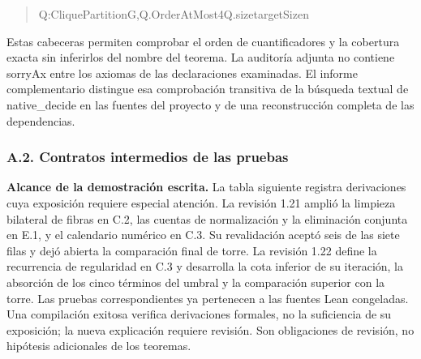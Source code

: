 \documentclass[spanish,11pt,a4paper]{article}
\newlength{\LeanCharWidth}
\begin{document}
\begin{quote}
\noindent \hspace*{\dimexpr 8\LeanCharWidth\relax}{\LeanSymbols ∃}\hspace*{\dimexpr 1\LeanCharWidth\relax}Q\hspace*{\dimexpr 1\LeanCharWidth\relax}:\hspace*{\dimexpr 1\LeanCharWidth\relax}CliquePartition\hspace*{\dimexpr 1\LeanCharWidth\relax}G,\hspace*{\dimexpr 1\LeanCharWidth\relax}Q.OrderAtMost\hspace*{\dimexpr 1\LeanCharWidth\relax}4\hspace*{\dimexpr 1\LeanCharWidth\relax}{\LeanSymbols ∧}\hspace*{\dimexpr 1\LeanCharWidth\relax}Q.size\hspace*{\dimexpr 1\LeanCharWidth\relax}{\LeanSymbols ≤}\hspace*{\dimexpr 1\LeanCharWidth\relax}targetSize\hspace*{\dimexpr 1\LeanCharWidth\relax}n\par
\end{quote}

Estas cabeceras permiten comprobar el orden de cuantificadores y la cobertura exacta sin inferirlos del nombre del teorema. La auditoría adjunta no contiene {\ttfamily\small sorryAx} entre los axiomas de las declaraciones examinadas. El informe complementario distingue esa comprobación transitiva de la búsqueda textual de {\ttfamily\small native\_\discretionary{\hbox{\ensuremath{\hookrightarrow}}}{}{}decide} en las fuentes del proyecto y de una reconstrucción completa de las dependencias.

\subsubsection{A.2. Contratos intermedios de las pruebas}\label{a.2.-contratos-intermedios-de-las-pruebas}

\textbf{Alcance de la demostración escrita.} La tabla siguiente registra derivaciones cuya exposición requiere especial atención. La revisión 1.21 amplió la limpieza bilateral de fibras en C.2, las cuentas de normalización y la eliminación conjunta en E.1, y el calendario numérico en C.3. Su revalidación aceptó seis de las siete filas y dejó abierta la comparación final de torre. La revisión 1.22 define la recurrencia de regularidad en C.3 y desarrolla la cota inferior de su iteración, la absorción de los cinco términos del umbral y la comparación superior con la torre. Las pruebas correspondientes ya pertenecen a las fuentes Lean congeladas. Una compilación exitosa verifica derivaciones formales, no la suficiencia de su exposición; la nueva explicación requiere revisión. Son obligaciones de revisión, no hipótesis adicionales de los teoremas.
\end{document}
